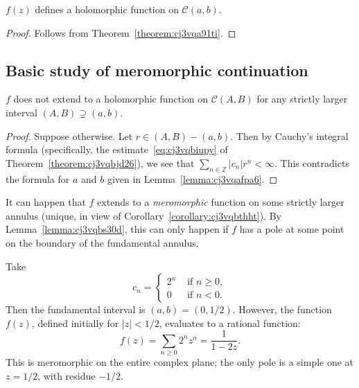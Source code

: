 \documentclass[reqno]{amsart}  \numberwithin{theorem}{section} \numberwithin{equation}{section}
\begin{document}
\begin{lemma}
  $f(z)$ defines a holomorphic function on $\mathcal{C}(a,b)$.
\end{lemma}
\begin{proof}
  Follows from Theorem~\ref{theorem:cj3vqa91ti}.
\end{proof}

\subsection{Basic study of meromorphic continuation}

\begin{lemma}\label{lemma:cj3vqbs30d}
  $f$ does not extend to a holomorphic function on $\mathcal{C}(A,B)$ for any strictly larger interval $(A,B) \supsetneq (a,b)$.
\end{lemma}
\begin{proof}
  Suppose otherwise.  Let $r \in (A,B) - (a,b)$.  Then by Cauchy's integral formula (specifically, the estimate~\eqref{eq:cj3vqbiupy} of Theorem~\ref{theorem:cj3vqbjd26}), we see that $\sum_{n \in \mathbb{Z}} \lvert c_n \rvert r^n < \infty$.  This contradicts the formula for $a$ and $b$ given in Lemma~\ref{lemma:cj3vqafpa6}.
\end{proof}

\begin{note}
  It can happen that $f$ extends to a \emph{meromorphic} function on some strictly larger annulus (unique, in view of Corollary~\ref{corollary:cj3vqbthht}).  By Lemma~\ref{lemma:cj3vqbs30d}, this can only happen if $f$ has a pole at some point on the boundary of the fundamental annulus.
\end{note}

\begin{example}
  Take
  \begin{equation*}
    c_n =
    \begin{cases}
      2^n & \text{ if } n \geq 0, \\
      0 & \text{ if } n < 0.
    \end{cases}
  \end{equation*}
  Then the fundamental interval is $(a, b) = (0, 1/2)$.  However, the function $f(z)$, defined initially for $\lvert z \rvert < 1/2$, evaluates to a rational function:
  \begin{equation*}
    f(z) = \sum_{n \geq 0} 2^n z^n
    = \frac{1}{1 - 2 z}.
  \end{equation*}
  This is meromorphic on the entire complex plane; the only pole is a simple one at $z = 1/2$, with residue $-1/2$.
\end{example}
\end{document}
